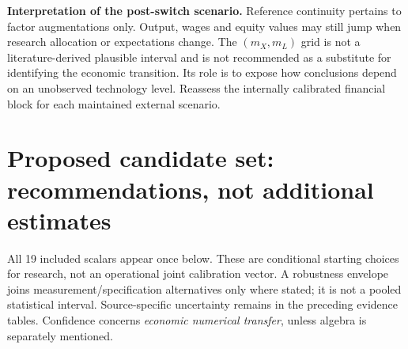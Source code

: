 \documentclass[10pt,a4paper,landscape]{article}
\begin{document}
\textbf{Interpretation of the post-switch scenario.}
Reference continuity pertains to factor augmentations only. Output, wages and equity values
may still jump when research allocation or expectations change.
The $(m_X,m_L)$ grid is not a literature-derived plausible interval and is not recommended
as a substitute for identifying the economic transition. Its role is to expose how conclusions
depend on an unobserved technology level. Reassess the internally calibrated financial block
for each maintained external scenario.


\clearpage
\section[Proposed candidate set: recommendations, not additional estimates]{Proposed candidate set: recommendations, not additional estimates}

All 19 included scalars appear once below. These are conditional starting choices for
research, not an operational joint calibration vector. A robustness envelope joins
measurement/specification alternatives only where stated; it is not a pooled statistical
interval. Source-specific uncertainty remains in the preceding evidence tables.
Confidence concerns \emph{economic numerical transfer}, unless algebra is separately mentioned.
\end{document}
